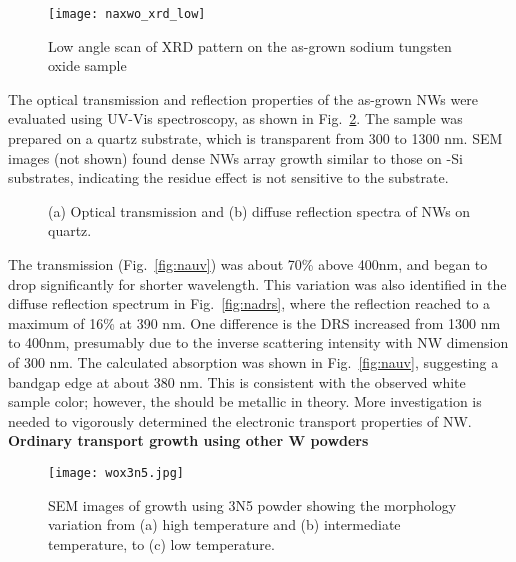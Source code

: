 \begin{figure}[htb]
\centering
\texttt{[image: naxwo\_xrd\_low]}
\caption[low angle scan of XRD pattern]{Low angle scan of XRD pattern on the as-grown sodium tungsten oxide sample}
\label{fig:naxrdlow}
\end{figure}

The optical transmission and reflection properties of the as-grown  NWs were evaluated using UV-Vis spectroscopy, as shown in Fig.~\ref{fig:ch3naxuvvis}. The sample was prepared on a quartz substrate, which is transparent from 300 to 1300 nm. SEM images (not shown) found dense NWs array growth similar to those on -Si substrates, indicating the residue effect is not sensitive to the substrate. 
\begin{figure}[htb]
\centering
{}\hspace{0.04\textwidth}
\caption[UV-Vis and DRS of  NWs on quartz]{(a) Optical transmission and (b) diffuse reflection spectra of  NWs on quartz.}
\label{fig:ch3naxuvvis}
\end{figure}
The transmission (Fig.~\ref{fig:nauv}) was about 70\% above 400nm, and began to drop significantly for shorter wavelength. This variation was also identified in the diffuse reflection spectrum in Fig.~\ref{fig:nadrs}, where the reflection reached to a maximum of 16\% at 390 nm. One difference is the DRS increased from 1300 nm to 400nm, presumably due to the inverse scattering intensity with NW dimension of 300 nm. The calculated absorption was shown in Fig.~\ref{fig:nauv}, suggesting a bandgap edge at about 380 nm. This is consistent with the observed white sample color; however, the  should be metallic in theory. More investigation is needed to vigorously determined the electronic transport properties of  NW. 
\textbf{Ordinary transport growth using other W powders}
\begin{figure}[htb]
\centering
\texttt{[image: wox3n5.jpg]}
\caption[SEM images of  growth using 3N5 powder]{SEM images of  growth using 3N5 powder showing the morphology variation from (a) high temperature and (b) intermediate temperature, to (c) low temperature.}
\label{fig:wox3n5}
\end{figure}

